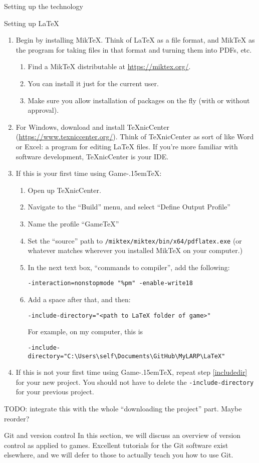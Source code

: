 \documentclass[11pt]{article}
\def\gametex{\mbox{Game\kern-.15em\TeX}}
\begin{document}
\begin{section}{Setting up the technology}
\begin{subsection}{Setting up \LaTeX{}}
\begin{enumerate}
\item Begin by installing MikTeX.  Think of \LaTeX{} as a file format, and MikTeX as the program for taking files in that format and turning them into PDFs, etc.
\begin{enumerate}
\item Find a MikTeX distributable at \url{https://miktex.org/}.
\item You can install it just for the current user.
\item Make sure you allow installation of packages on the fly (with or without approval).
\end{enumerate}
\item For Windows, download and install TeXnicCenter (\url{https://www.texniccenter.org/}).  Think of TeXnicCenter as sort of like Word or Excel: a program for editing \LaTeX{} files.  If you're more familiar with software development, TeXnicCenter is your IDE.
\item If this is your first time using \gametex{}:
\begin{enumerate}
\item Open up TeXnicCenter.
\item Navigate to the “Build” menu, and select “Define Output Profile”
\item Name the profile “GameTeX”
\item Set the “source” path to \texttt{/miktex/miktex/bin/x64/pdflatex.exe} (or whatever matches wherever you installed MikTeX on your computer.)   
\item In the next text box, “commands to compiler”, add the following:
\begin{verbatim}
-interaction=nonstopmode "%pm" -enable-write18
\end{verbatim}
\item \label{includedir} Add a space after that, and then: 
\begin{verbatim}
-include-directory="<path to LaTeX folder of game>"
\end{verbatim}
For example, on my computer, this is
\begin{verbatim}
-include-directory="C:\Users\self\Documents\GitHub\MyLARP\LaTeX"
\end{verbatim}
\end{enumerate}
\item If this is not your first time using \gametex{}, repeat step \ref{includedir} for your new project.  You should not have to delete the \lstinline|-include-directory| for your previous project.
\end{enumerate}
TODO: integrate this with the whole ``downloading the project'' part.  Maybe reorder?
\end{subsection}
\begin{subsection}{Git and version control}
In this section, we will discuss an overview of version control as applied to games.  Excellent tutorials for the Git software exist elsewhere, and we will defer to those to actually teach you how to use Git.


\end{subsection}
\end{section}
\end{document}
